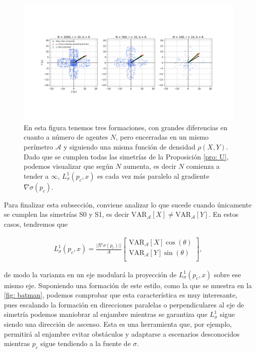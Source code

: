 \begin{figure}[!h]
\centering
\includegraphics[trim={3cm 5.0cm 3cm 5.0cm}, clip, width=1\columnwidth]{./fig/prop5.png}
\caption{En esta figura tenemos tres formaciones, con grandes diferencias en cuanto a número de agentes $N$, pero encerradas en un mismo perímetro $\mathcal{A}$ y siguiendo una misma función de densidad $\rho(X,Y)$. Dado que se cumplen todas las simetrías de la Proposición \ref{pro: U}, podemos visualizar que según $N$ aumenta, es decir $N$ comienza a tender a $\infty$, $L_\sigma^1(p_c, x)$ es cada vez más paralelo al gradiente $\nabla\sigma(p_c)$.}
\label{fig: prop5}
\end{figure}

Para finalizar esta subsección, conviene analizar lo que sucede cuando únicamente se cumplen las simetrías S0 y S1, es decir $\text{VAR}_{\mathcal{A}}[X] \neq \text{VAR}_{\mathcal{A}}[Y]$. En estos casos, tendremos que

\begin{align*} 
    L_\sigma^1(p_c, x)  = 
     \frac{||\nabla\sigma(p_c)||}{A} \begin{bmatrix}
        \text{VAR}_{\mathcal{A}}[X] \cos(\theta)\\
        \text{VAR}_{\mathcal{A}}[Y] \sin(\theta)\\
    \end{bmatrix},
\end{align*}

de modo la varianza en un eje modulará la proyección de $L_\sigma^1(p_c, x)$ sobre ese mismo eje. Suponiendo una formación de este estilo, como la que se muestra en la \autoref{fig: batman}, podemos comprobar que esta característica es muy interesante, pues escalando la formación en direcciones paralelas o perpendiculares al eje de simetría podemos maniobrar al enjambre mientras se garantiza que $L_\sigma^1$ sigue siendo una dirección de ascenso. Esta es una herramienta que, por ejemplo, permitirá al enjambre evitar obstáculos y adaptarse a escenarios desconocidos mientras $p_c$ sigue tendiendo a la fuente de $\sigma$. 

